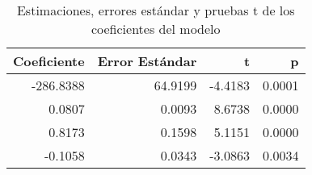 \begin{table}[H]
    \centering
    \color{blue}
    \caption{Estimaciones, errores estándar y pruebas t de los coeficientes del modelo}
    \label{tab:coeficientes_regresion}
    \begin{tabular}{rrrr}
        \toprule
        Coeficiente & Error Estándar & t & p \\
        \midrule
        -286.8388 & 64.9199 & -4.4183 & 0.0001 \\
        0.0807    & 0.0093  &  8.6738 & 0.0000 \\
        0.8173    & 0.1598  &  5.1151 & 0.0000 \\
        -0.1058   & 0.0343  & -3.0863 & 0.0034 \\
        \bottomrule
    \end{tabular}
\end{table}
